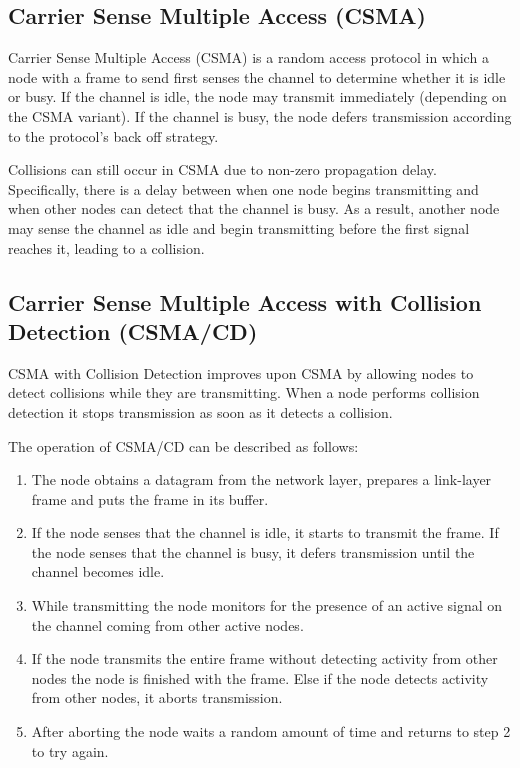 \documentclass[12pt letter]{report}
\begin{document}
\subsection{Carrier Sense Multiple Access (CSMA)}

Carrier Sense Multiple Access (CSMA) is a random access protocol
in which a node with a frame to send first senses the channel to
determine whether it is idle or busy. If the channel is idle, the
node may transmit immediately (depending on the CSMA variant). If
the channel is busy, the node defers transmission according to the
protocol’s back off strategy.

Collisions can still occur in CSMA due to non-zero propagation delay.
Specifically, there is a delay between when one node begins transmitting
and when other nodes can detect that the channel is busy. As a result,
another node may sense the channel as idle and begin transmitting before
the first signal reaches it, leading to a collision.

\subsection{Carrier Sense Multiple Access with Collision Detection (CSMA/CD)}

CSMA with Collision Detection improves upon CSMA by allowing nodes to
detect collisions while they are transmitting. When a node performs
collision detection it stops transmission as soon as it detects a collision.

The operation of CSMA/CD can be described as follows:
\begin{enumerate}
  \item The node obtains a datagram from the network layer, prepares
    a link-layer frame and puts the frame in its buffer.
  \item If the node senses that the channel is idle, it starts to
    transmit the frame. If the node senses that the channel is busy,
    it defers transmission until the channel becomes idle.
  \item While transmitting the node monitors for the presence of an
    active signal on the channel coming from other active nodes.
  \item If the node transmits the entire frame without detecting
    activity from other nodes the node is finished with the frame.
    Else if the node detects activity from other nodes, it aborts transmission.
  \item After aborting the node waits a random amount of time and
    returns to step 2 to try again.
\end{enumerate}
\end{document}
